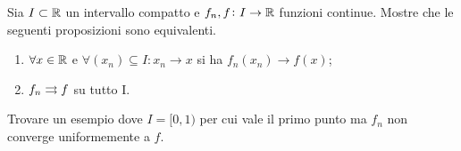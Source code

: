 \begin{es}
  Sia $ I \subset \mathbb{R} $ un intervallo compatto e $ f_n, f \colon I \to \mathbb{R} $ funzioni continue. Mostre che le seguenti proposizioni sono equivalenti.
  \begin{enumerate}[label = (\roman*)]
  \item $ \forall x \in \mathbb{R} $ e $ \forall (x_n) \subseteq I : x_n \to x $ si ha $ f_n(x_n) \to f(x) $;
  \item $ f_n \rightrightarrows f $ su tutto I.
  \end{enumerate}
  Trovare un esempio dove $ I = [0, 1) $ per cui vale il primo punto ma $ f_n $ non converge uniformemente a $ f $.
\end{es}